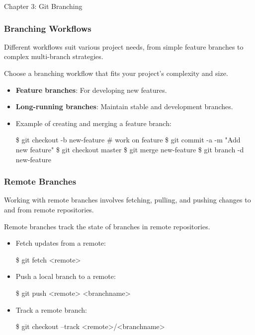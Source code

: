 \begin{notes}{Chapter 3: Git Branching}
\begin{highlight}
    \end{highlight}
    
    \subsubsection*{Branching Workflows}
    
    Different workflows suit various project needs, from simple feature branches to complex multi-branch strategies.
    
    \begin{highlight}
    
        Choose a branching workflow that fits your project's complexity and size.
        
        \begin{itemize}
            \item \textbf{Feature branches}: For developing new features.
            \item \textbf{Long-running branches}: Maintain stable and development branches.
            \item Example of creating and merging a feature branch:
    \begin{code}[Bash]
    \$ git checkout -b new-feature
    # work on feature
    \$ git commit -a -m "Add new feature"
    \$ git checkout master
    \$ git merge new-feature
    \$ git branch -d new-feature
    \end{code}
        \end{itemize}
    
    \end{highlight}
    
    \subsubsection*{Remote Branches}
    
    Working with remote branches involves fetching, pulling, and pushing changes to and from remote repositories.
    
    \begin{highlight}
    
        Remote branches track the state of branches in remote repositories.
        
        \begin{itemize}
            \item Fetch updates from a remote:
    \begin{code}[Bash]
    \$ git fetch <remote>
    \end{code}
            \item Push a local branch to a remote:
    \begin{code}[Bash]
    \$ git push <remote> <branchname>
    \end{code}
            \item Track a remote branch:
    \begin{code}[Bash]
    \$ git checkout --track <remote>/<branchname>
    \end{code}
        \end{itemize}
    

\end{highlight}
\end{notes}
